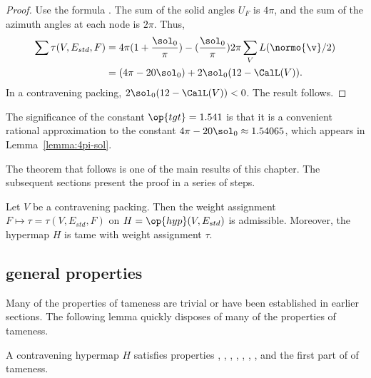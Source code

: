 \begin{proof}
Use the formula .
  The sum of the solid angles $U_F$ is $4\pi$, and the sum of the azimuth
  angles at each node is $2\pi$.
Thus,
\begin{align}\label{eqn:delta0}
  \sum \tau (V,E_{std},F) 
  &= 4\pi (1 + \dfrac{\sol_0}{\pi}) 
- (\dfrac{\sol_0}{\pi}) 2\pi \sum_{V} L(\normo{\v}/2)\vspace{6pt}\\
&= (4\pi - 20\sol_0) + 2\sol_0 (12 - \CalL(V)).
\end{align}
In a contravening packing, $2\sol_0(12-\CalL(V))<0$.
The result follows.
\end{proof}

\begin{remark}\label{rem:tgt}
The significance of the constant $\op{tgt}=1.541$ is that it is a
convenient rational approximation to the constant $4\pi -
20\sol_0\approx 1.54065$, which appears in Lemma~\ref{lemma:4pi-sol}.
%
\end{remark}

The theorem that follows is one of the main results of this chapter.  The subsequent
sections present the proof in a series of steps.

\begin{theorem} \label{theorem:contravene}
  Let $V$ be a contravening packing.  Then the weight assignment
  $F\mapsto\tau=\tau(V,E_{std},F)$ on $H=\op{hyp}(V,E_{std})$ is
  admissible.  Moreover, the hypermap $H$ is tame with weight
  assignment $\tau$.
\end{theorem}
%
%
%



\subsection{general properties}
\label{sec:startame}


Many of the properties of tameness are trivial or have been
established in earlier sections.  The following lemma quickly disposes
of many of the properties of tameness.

\begin{lemma}[]\label{lemma:multi}
  A contravening hypermap $H$ satisfies properties ,
  , , , , , , and the first
  part of 
of tameness.
\end{lemma}

